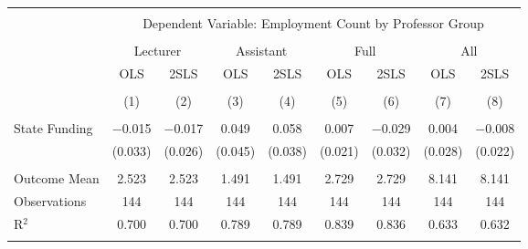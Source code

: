 
\begin{tabular}{@{\extracolsep{5pt}}lcccccccc} 
\\[-1.8ex]\hline 
\hline \\[-1.8ex] 
 & \multicolumn{8}{c}{Dependent Variable: Employment Count by Professor Group} \\ 
\cline{2-9} 
\\[-1.8ex] & \multicolumn{2}{c}{Lecturer} & \multicolumn{2}{c}{Assistant} & \multicolumn{2}{c}{Full} & \multicolumn{2}{c}{All} \\ 
 & OLS & 2SLS & OLS & 2SLS & OLS & 2SLS & OLS & 2SLS \\ 
\\[-1.8ex] & (1) & (2) & (3) & (4) & (5) & (6) & (7) & (8)\\ 
\hline \\[-1.8ex] 
 State Funding & $-$0.015 & $-$0.017 & 0.049 & 0.058 & 0.007 & $-$0.029 & 0.004 & $-$0.008 \\ 
  & (0.033) & (0.026) & (0.045) & (0.038) & (0.021) & (0.032) & (0.028) & (0.022) \\ 
 \hline \\[-1.8ex] 
Outcome Mean & 2.523 & 2.523 & 1.491 & 1.491 & 2.729 & 2.729 & 8.141 & 8.141 \\ 
Observations & 144 & 144 & 144 & 144 & 144 & 144 & 144 & 144 \\ 
R$^{2}$ & 0.700 & 0.700 & 0.789 & 0.789 & 0.839 & 0.836 & 0.633 & 0.632 \\ 
\hline 
\hline \\[-1.8ex] 
\end{tabular} 
